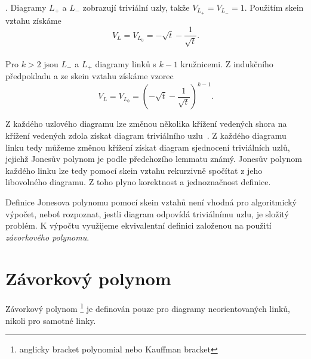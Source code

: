 \begin{dukaz}
. Diagramy $L_+$ a $L_-$ zobrazují triviální uzly, takže $V_{L_+} = V_{L_-} = 1$. Použitím skein vztahu získáme $$V_ L = V_{L_0} = - \sqrt{t} -\frac{1}{\sqrt{t}} .$$ \\
Pro $k > 2$ jsou $L_-$ a $L_+ $ diagramy linků s $k-1$ kružnicemi. Z indukčního předpokladu a ze skein vztahu získáme vzorec $$V_ L = V_{L_0} = \left(- \sqrt{t} -\frac{1}{\sqrt{t}}\right) ^{k-1}.$$
\end{dukaz}  

\begin{pozn}
Z každého uzlového diagramu lze změnou několika křížení vedených shora na křížení vedených zdola získat diagram triviálního uzlu~\cite{Adams2004}. Z každého diagramu linku tedy můžeme změnou křížení získat diagram sjednocení triviálních uzlů, jejichž Jonesův polynom je podle předchozího lemmatu známý. Jonesův polynom každého linku lze tedy pomocí skein vztahu rekurzivně spočítat z jeho libovolného diagramu. Z toho plyno korektnost a jednoznačnost definice.
\end{pozn}


Definice Jonesova polynomu pomocí skein vztahů není vhodná pro algoritmický výpočet, neboť rozpoznat, jestli diagram odpovídá triviálnímu uzlu, je složitý problém. K výpočtu využijeme ekvivalentní definici založenou na použití \emph{závorkového polynomu}.

\section{Závorkový polynom}
Závorkový polynom \footnote{anglicky bracket polynomial nebo Kauffman bracket} je definován pouze pro diagramy neorientovaných linků, nikoli pro samotné linky.

